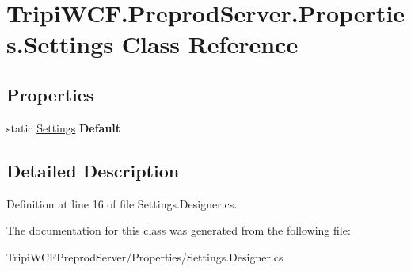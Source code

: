 \hypertarget{class_tripi_w_c_f_1_1_preprod_server_1_1_properties_1_1_settings}{
\section{TripiWCF.PreprodServer.Properties.Settings Class Reference}
\label{class_tripi_w_c_f_1_1_preprod_server_1_1_properties_1_1_settings}
}
\subsection*{Properties}
\begin{DoxyCompactItemize}
\item 
\hypertarget{class_tripi_w_c_f_1_1_preprod_server_1_1_properties_1_1_settings_a8e46e764ca8164c6ef34e28aa7996806}{
static \hyperlink{class_tripi_w_c_f_1_1_preprod_server_1_1_properties_1_1_settings}{Settings} {\bfseries Default}}
\label{class_tripi_w_c_f_1_1_preprod_server_1_1_properties_1_1_settings_a8e46e764ca8164c6ef34e28aa7996806}

\end{DoxyCompactItemize}


\subsection{Detailed Description}


Definition at line 16 of file Settings.Designer.cs.

The documentation for this class was generated from the following file:\begin{DoxyCompactItemize}
\item 
TripiWCFPreprodServer/Properties/Settings.Designer.cs\end{DoxyCompactItemize}
